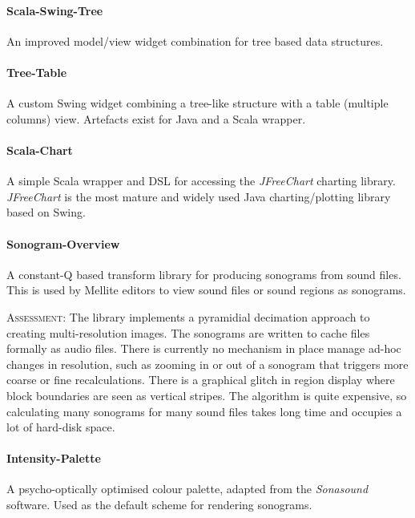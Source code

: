 \documentclass[11pt,a4paper]{article}
\newcommand{\software}[1]{\textit{#1}}
\newcommand{\assessment}[0]{\textsc{Assessment:}}
\begin{document}
\paragraph{Scala-Swing-Tree}

An improved model/view widget combination for tree based data structures.

\paragraph{Tree-Table}

A custom Swing widget combining a tree-like structure with a table (multiple columns) view. Artefacts exist for Java and a Scala wrapper.

\paragraph{Scala-Chart}

A simple Scala wrapper and DSL for accessing the \software{JFreeChart} charting library. \software{JFreeChart} is the most mature and widely used Java charting/plotting library based on Swing.

\paragraph{Sonogram-Overview}

A constant-Q based transform library for producing sonograms from sound files. This is used by Mellite editors to view sound files or sound regions as sonograms.

\assessment{} The library implements a pyramidial decimation approach to creating multi-resolution images. The sonograms are written to cache files formally as audio files. There is currently no mechanism in place manage ad-hoc changes in resolution, such as zooming in or out of a sonogram that triggers more coarse or fine recalculations. There is a graphical glitch in region display where block boundaries are seen as vertical stripes. The algorithm is quite expensive, so calculating many sonograms for many sound files takes long time and occupies a lot of hard-disk space.

\paragraph{Intensity-Palette}

A psycho-optically optimised colour palette, adapted from the \software{Sonasound} software. Used as the default scheme for rendering sonograms.
\end{document}
